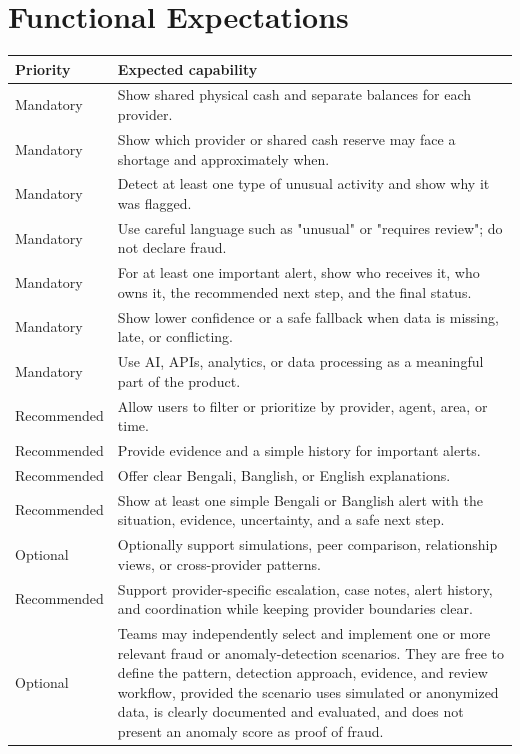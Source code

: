 \documentclass[11pt,a4paper]{article}
\begin{document}
\section{Functional Expectations}
\noindent
\begin{tabularx}{\textwidth}{@{} l X @{}}
\toprule
\textbf{Priority} & \textbf{Expected capability} \\
\midrule
Mandatory & Show shared physical cash and separate balances for each provider. \\
\addlinespace
Mandatory & Show which provider or shared cash reserve may face a shortage and approximately when. \\
\addlinespace
Mandatory & Detect at least one type of unusual activity and show why it was flagged. \\
\addlinespace
Mandatory & Use careful language such as "unusual" or "requires review"; do not declare fraud. \\
\addlinespace
Mandatory & For at least one important alert, show who receives it, who owns it, the recommended next step, and the final status. \\
\addlinespace
Mandatory & Show lower confidence or a safe fallback when data is missing, late, or conflicting. \\
\addlinespace
Mandatory & Use AI, APIs, analytics, or data processing as a meaningful part of the product. \\
\addlinespace
Recommended & Allow users to filter or prioritize by provider, agent, area, or time. \\
\addlinespace
Recommended & Provide evidence and a simple history for important alerts. \\
\addlinespace
Recommended & Offer clear Bengali, Banglish, or English explanations. \\
\addlinespace
Recommended & Show at least one simple Bengali or Banglish alert with the situation, evidence, uncertainty, and a safe next step. \\
\addlinespace
Optional & Optionally support simulations, peer comparison, relationship views, or cross-provider patterns. \\
\addlinespace
Recommended & Support provider-specific escalation, case notes, alert history, and coordination while keeping provider boundaries clear. \\
\addlinespace
Optional & Teams may independently select and implement one or more relevant fraud or anomaly-detection scenarios. They are free to define the pattern, detection approach, evidence, and review workflow, provided the scenario uses simulated or anonymized data, is clearly documented and evaluated, and does not present an anomaly score as proof of fraud. \\
\bottomrule
\end{tabularx}
\end{document}
